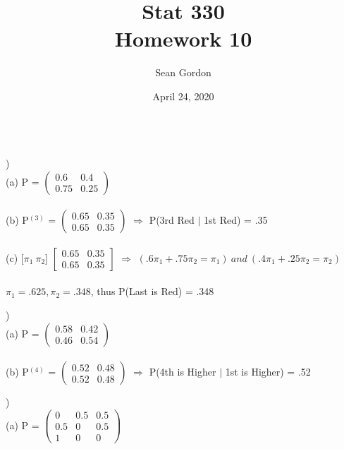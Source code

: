 \documentclass[12pt]{article}
\title{Stat 330\\Homework 10}
\author{Sean Gordon}
\date{April 24, 2020}
\begin{document}
\maketitle


\noindent\hrulefill \\[-.8em]


)\\
\indent (a) P = 
$\begin{pmatrix}
0.6 & 0.4\\
0.75 & 0.25
\end{pmatrix}$\\\\

\indent (b) 
P$^{(3)}$ = 
$\begin{pmatrix}
0.65 & 0.35\\
0.65 & 0.35
\end{pmatrix}$ $\Rightarrow$ P(3rd Red $|$ 1st Red) = .35\\\\


\indent (c) [$\pi_1 \ \pi_2$]
$\begin{bmatrix}
0.65 & 0.35\\
0.65 & 0.35
\end{bmatrix}$ $\Rightarrow$ $(.6\pi_1 + .75\pi_2 = \pi_1)\ and\ (.4\pi_1 + .25\pi_2 = \pi_2)$\\\\
\indent \indent $\pi_1 = .625, \pi_2 = .348$, thus P(Last is Red) = .348\\


\noindent \hrulefill 


)\\
\indent (a) P = 
$\begin{pmatrix}
0.58 & 0.42\\
0.46 & 0.54
\end{pmatrix}$\\\\

\indent (b) P$^{(4)}$ = 
$\begin{pmatrix}
0.52 & 0.48\\
0.52 & 0.48
\end{pmatrix}$ $\Rightarrow$ P(4th is Higher $|$ 1st is Higher) = .52\\


\noindent \hrulefill 


)\\
\indent (a) P = 
$\begin{pmatrix}
0 & 0.5 & 0.5\\
0.5 & 0 & 0.5\\
1 & 0 & 0
\end{pmatrix}$\\\\
\end{document}
